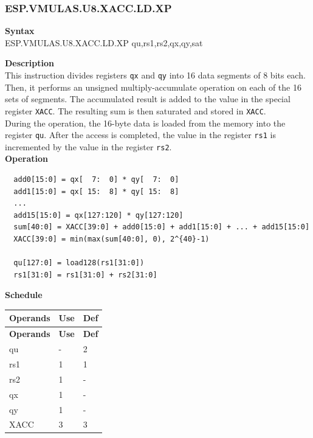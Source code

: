 \newpage
\subsubsection{ESP.VMULAS.U8.XACC.LD.XP}\label{instruction:ESPVMULASU8XACCLDXP}
\textbf{Syntax}\\
ESP.VMULAS.U8.XACC.LD.XP qu,rs1,rs2,qx,qy,sat

\textbf{Description}\\
This instruction divides registers \lstinline{qx} and \lstinline{qy} into 16 data segments of 8 bits each. Then, it performs an unsigned multiply-accumulate operation on each of the 16 sets of segments. The accumulated result is added to the value in the special register \lstinline{XACC}. The resulting sum is then saturated and stored in \lstinline{XACC}.\\
During the operation, the 16-byte data is loaded from the memory into the register \lstinline{qu}. After the access is completed, the value in the register \lstinline{rs1} is incremented by the value in the register \lstinline{rs2}.\\
\textbf{Operation}
\begin{lstlisting}
  add0[15:0] = qx[  7:  0] * qy[  7:  0]
  add1[15:0] = qx[ 15:  8] * qy[ 15:  8]
  ...
  add15[15:0] = qx[127:120] * qy[127:120]
  sum[40:0] = XACC[39:0] + add0[15:0] + add1[15:0] + ... + add15[15:0]
  XACC[39:0] = min(max(sum[40:0], 0), 2^{40}-1)

  qu[127:0] = load128(rs1[31:0])
  rs1[31:0] = rs1[31:0] + rs2[31:0]
\end{lstlisting}

\textbf{Schedule}\\
\begin{longtable}[c]{|l|l|l|}
    \hline
    \rowcolor{lightgray}
    \textbf{Operands} & \textbf{Use} & \textbf{Def} \\\hline
    \endfirsthead
    \hline
    \rowcolor{lightgray}
     \textbf{Operands} & \textbf{Use} & \textbf{Def} \\\hline
    \endhead
    \hline
    \endfoot

    qu & - & 2 \\\hline
    rs1 & 1 & 1 \\\hline
    rs2 & 1 & - \\\hline
     qx & 1 & - \\\hline
     qy & 1 & - \\\hline
     XACC & 3 & 3

\end{longtable}

